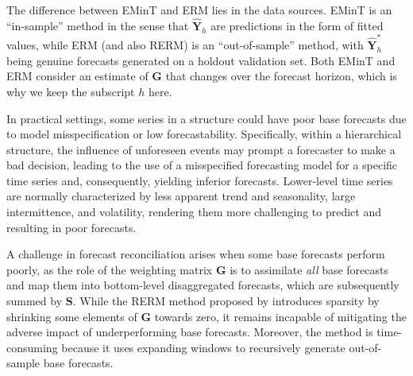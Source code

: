\documentclass[
  11pt]{article}
\theoremstyle{plain}
\theoremstyle{remark}
\begin{document}
The difference between EMinT and ERM lies in the data sources. EMinT is
an ``in-sample'' method in the sense that \(\hat{\bm{Y}}_{h}\) are
predictions in the form of fitted values, while ERM (and also RERM) is
an ``out-of-sample'' method, with \(\hat{\bm{Y}}_{h}^{*}\) being genuine
forecasts generated on a holdout validation set. Both EMinT and ERM
consider an estimate of \(\bm{G}\) that changes over the forecast
horizon, which is why we keep the subscript \(h\) here.

In practical settings, some series in a structure could have poor base
forecasts due to model misspecification or low forecastability.
Specifically, within a hierarchical structure, the influence of
unforeseen events may prompt a forecaster to make a bad decision,
leading to the use of a misspecified forecasting model for a specific
time series and, consequently, yielding inferior forecasts. Lower-level
time series are normally characterized by less apparent trend and
seasonality, large intermittence, and volatility, rendering them more
challenging to predict and resulting in poor forecasts.

A challenge in forecast reconciliation arises when some base forecasts
perform poorly, as the role of the weighting matrix \(\bm{G}\) is to
assimilate \emph{all} base forecasts and map them into bottom-level
disaggregated forecasts, which are subsequently summed by \(\bm{S}\).
While the RERM method proposed by \citet{Ben_Taieb2019-be} introduces
sparsity by shrinking some elements of \(\bm{G}\) towards zero, it
remains incapable of mitigating the adverse impact of underperforming
base forecasts. Moreover, the method is time-consuming because it uses
expanding windows to recursively generate out-of-sample base forecasts.
\end{document}
